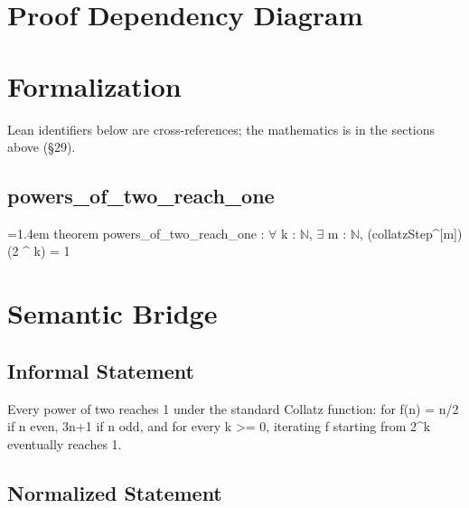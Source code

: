 \documentclass[11pt]{article}
\begin{document}
\section{Proof Dependency Diagram}
\begin{center}
\end{center}
\section{Formalization}
Lean identifiers below are cross-references; the mathematics is in the sections above (\S{}29).
\subsection*{powers\_of\_two\_reach\_one}
{\footnotesize\ttfamily\raggedright\hangindent=1.4em\noindent
\hspace*{0.00em}theorem powers\_\allowbreak{}of\_\allowbreak{}two\_\allowbreak{}reach\_\allowbreak{}one : \ensuremath{\forall} k : \ensuremath{\mathbb{N}}, \ensuremath{\exists} m : \ensuremath{\mathbb{N}}, (collatzStep\textasciicircum{}[m]) (2 \textasciicircum{} k) = 1\par
}

\section{Semantic Bridge}
\subsection*{Informal Statement}
Every power of two reaches 1 under the standard Collatz function: for f(n) = n/2 if n even, 3n+1 if n odd, and for every k >= 0, iterating f starting from 2\textasciicircum{}k eventually reaches 1.
\subsection*{Normalized Statement}
\end{document}
